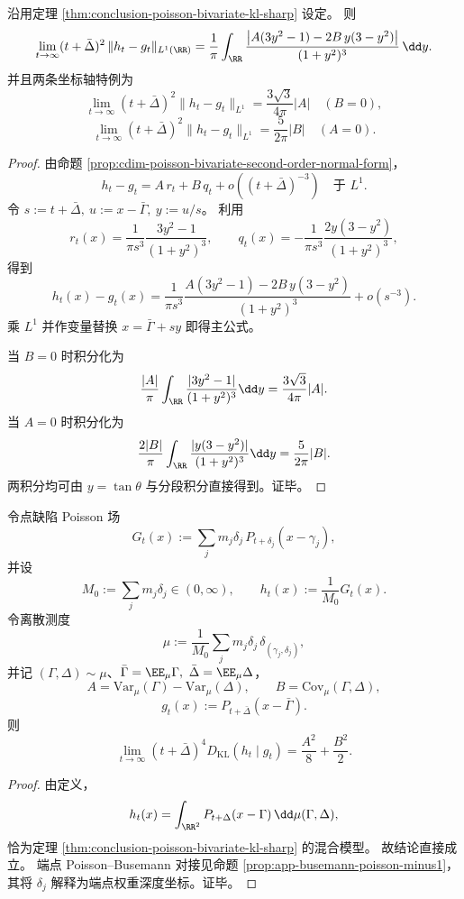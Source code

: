 \begin{theorem}[二参数全变差极限的显式积分律]\label{thm:conclusion-poisson-bivariate-tv-sharp}
沿用定理 \ref{thm:conclusion-poisson-bivariate-kl-sharp} 设定。
则
\[
\lim_{t\to\infty}(t+\bar\Delta)^2\,\|h_t-g_t\|_{L^1(\RR)}
=\frac{1}{\pi}\int_{\RR}
\frac{\left|A(3y^2-1)-2B\,y(3-y^2)\right|}{(1+y^2)^3}\,\dd y.
\]
并且两条坐标轴特例为
\[
\lim_{t\to\infty}(t+\bar\Delta)^2\|h_t-g_t\|_{L^1}
=\frac{3\sqrt3}{4\pi}|A|
\quad(B=0),
\]
\[
\lim_{t\to\infty}(t+\bar\Delta)^2\|h_t-g_t\|_{L^1}
=\frac{5}{2\pi}|B|
\quad(A=0).
\]
\end{theorem}
\begin{proof}
由命题 \ref{prop:cdim-poisson-bivariate-second-order-normal-form}，
\[
h_t-g_t
=A\,r_t+B\,q_t+o\!\left((t+\bar\Delta)^{-3}\right)\quad\text{于 }L^1.
\]
令 \(s:=t+\bar\Delta,\ u:=x-\bar\Gamma,\ y:=u/s\)。
利用
\[
r_t(x)=\frac{1}{\pi s^3}\frac{3y^2-1}{(1+y^2)^3},\qquad
q_t(x)=-\frac{1}{\pi s^3}\frac{2y(3-y^2)}{(1+y^2)^3},
\]
得到
\[
h_t(x)-g_t(x)
=\frac{1}{\pi s^3}
\frac{A(3y^2-1)-2B\,y(3-y^2)}{(1+y^2)^3}
+o(s^{-3}).
\]
乘 \(L^1\) 并作变量替换 \(x=\bar\Gamma+sy\) 即得主公式。
\par
当 \(B=0\) 时积分化为
\[
\frac{|A|}{\pi}\int_{\RR}\frac{|3y^2-1|}{(1+y^2)^3}\dd y
=\frac{3\sqrt3}{4\pi}|A|.
\]
当 \(A=0\) 时积分化为
\[
\frac{2|B|}{\pi}\int_{\RR}\frac{|y(3-y^2)|}{(1+y^2)^3}\dd y
=\frac{5}{2\pi}|B|.
\]
两积分均可由 \(y=\tan\theta\) 与分段积分直接得到。证毕。
\end{proof}

\begin{theorem}\label{thm:conclusion-point-defect-poisson-entropy-fingerprint}
令点缺陷 Poisson 场
\[
G_t(x):=\sum_j m_j\delta_j\,P_{t+\delta_j}(x-\gamma_j),
\]
并设
\[
M_0:=\sum_j m_j\delta_j\in(0,\infty),\qquad
h_t(x):=\frac{1}{M_0}G_t(x).
\]
令离散测度
\[
\mu:=\frac{1}{M_0}\sum_j m_j\delta_j\,\delta_{(\gamma_j,\delta_j)},
\]
并记 \((\Gamma,\Delta)\sim\mu\)、\(\bar\Gamma=\EE_\mu\Gamma,\ \bar\Delta=\EE_\mu\Delta\)，
\[
A=\mathrm{Var}_\mu(\Gamma)-\mathrm{Var}_\mu(\Delta),\qquad
B=\mathrm{Cov}_\mu(\Gamma,\Delta),
\]
\[
g_t(x):=P_{t+\bar\Delta}(x-\bar\Gamma).
\]
则
\[
\lim_{t\to\infty}(t+\bar\Delta)^4 D_{\mathrm{KL}}(h_t\mid g_t)
=\frac{A^2}{8}+\frac{B^2}{2}.
\]
\end{theorem}
\begin{proof}
由定义，
\[
h_t(x)=\int_{\RR^2}P_{t+\Delta}(x-\Gamma)\,\dd\mu(\Gamma,\Delta),
\]
恰为定理 \ref{thm:conclusion-poisson-bivariate-kl-sharp} 的混合模型。
故结论直接成立。
端点 Poisson--Busemann 对接见命题 \ref{prop:app-busemann-poisson-minus1}，其将 \(\delta_j\) 解释为端点权重深度坐标。证毕。
\end{proof}


